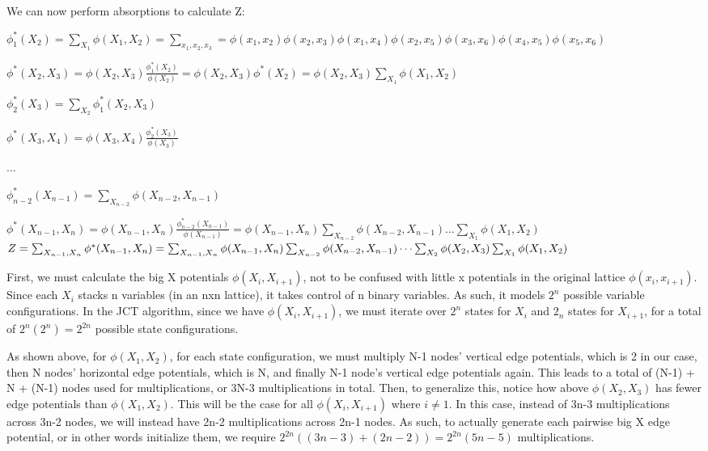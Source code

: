 \documentclass[12pt]{article}
\begin{document}
We can now perform absorptions to calculate Z:

$\phi_1^*(X_2) = \sum_{X_1} \phi(X_1, X_2) = \sum_{x_1, x_2, x_3} = \phi(x_1, x_2)\phi(x_2, x_3)\phi(x_1, x_4)\phi(x_2, x_5)\phi(x_3, x_6)\phi(x_4, x_5)\phi(x_5, x_6)$

$\phi^*(X_2, X_3) = \phi(X_2, X_3)\frac{\phi_1^*(X_2)}{\phi(X_2)} = \phi(X_2, X_3)\phi^*(X_2) = \phi(X_2, X_3)\sum_{X_1} \phi(X_1, X_2)$

$\phi_2^*(X_3) = \sum_{X_2} \phi_1^*(X_2, X_3)$

$\phi^*(X_3, X_4) = \phi(X_3, X_4)\frac{\phi_2^*(X_3)}{\phi(X_3)}$

$\dots$

$\phi_{n-2}^*(X_{n-1}) = \sum_{X_{n-2}} \phi(X_{n-2}, X_{n-1})$

$\phi^*(X_{n-1}, X_n) = \phi(X_{n-1}, X_n)\frac{\phi_{n-2}^*(X_{n-1})}{\phi(X_{n-1})} = \phi(X_{n-1}, X_n)\sum_{X_{n-2}} \phi(X_{n-2}, X_{n-1})\dots \sum_{X_1} \phi(X_1, X_2)$\\

$Z = \sum_{X_{n-1}, X_n} \phi^*(X_{n-1}, X_n) \\
= \sum_{X_{n-1}, X_n} \phi(X_{n-1}, X_n)\sum_{X_{n-2}} \phi(X_{n-2}, X_{n-1}) \dots \sum_{X_2} \phi(X_2, X_3)\sum_{X_1} \phi(X_1, X_2)$

First, we must calculate the big X potentials $\phi(X_i, X_{i+1})$, not to be confused with little x potentials in the original lattice $\phi(x_i, x_{i+1})$. Since each $X_i$ stacks n variables (in an nxn lattice), it takes control of n binary variables. As such, it models $2^n$ possible variable configurations. In the JCT algorithm, since we have $\phi(X_i, X_{i+1})$, we must iterate over $2^n$ states for $X_i$ and $2_n$ states for $X_{i+1}$, for a total of $2^n(2^n) = 2^{2n}$ possible state configurations.

As shown above, for $\phi(X_1, X_2)$, for each state configuration, we must multiply N-1 nodes' vertical edge potentials, which is 2 in our case, then N nodes' horizontal edge potentials, which is N, and finally N-1 node's vertical edge potentials again. This leads to a total of (N-1) + N + (N-1) nodes used for multiplications, or 3N-3 multiplications in total. Then, to generalize this, notice how above $\phi(X_2, X_3)$ has fewer edge potentials than $\phi(X_1, X_2)$. This will be the case for all $\phi(X_i, X_{i+1})$ where $i \neq 1$. In this case, instead of 3n-3 multiplications across 3n-2 nodes, we will instead have 2n-2 multiplications across 2n-1 nodes. As such, to actually generate each pairwise big X edge potential, or in other words initialize them, we require $2^{2n}((3n-3) + (2n-2)) = 2^{2n}(5n-5)$ multiplications.
\end{document}
